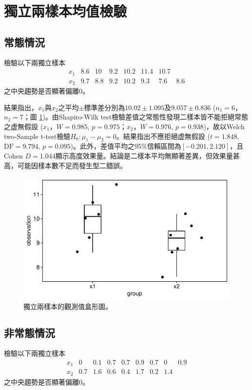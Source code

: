\documentclass[12pt]{article}
\begin{document}
\section{獨立兩樣本均值檢驗}
\subsection{常態情況}
檢驗以下兩獨立樣本
\[
\begin{matrix}
x_1 & 8.6 & 10 & 9.2 & 10.2 & 11.4 & 10.7 & \\
x_2 & 9.7 & 8.8 & 9.2 & 10.2 & 9.3 & 7.6 & 8.6
\end{matrix}
\]
之中央趨勢是否顯著偏離0。

結果指出，$x_1$與$x_2$之平均$\pm$標準差分別為$10.02 \pm 1.095$及$9.057 \pm 0.836$ ($n_1 = 6$，$n_2 = 7$；圖 \ref{fig:normal_independent_test})。由Shapiro-Wilk test檢驗差值之常態性發現二樣本皆不能拒絕常態之虚無假設 ($x_1$，$W = 0.985$, $p = 0.975$；$x_2$，$W = 0.976$, $p = 0.938$)，故以Welch two-Sample t-test檢驗$H_0: \mu_1 - \mu_2 = 0$。結果指出不應拒絕虚無假設 ($t = 1.848$, $\text{DF} = 9.794$, $p = 0.095$)。此外，差值平均之95\%信賴區間為$\left[-0.201, 2.120\right]$，且Cohen $D = 1.044$顯示高度效果量。結論是二樣本平均無顯著差異，但效果量甚高，可能因樣本數不足而發生型二錯誤。

\begin{figure}[htb!]
	\centering
	\includegraphics[]{normal_independent_test.pdf}
	\caption{獨立兩樣本的觀測值盒形圖。}
	\label{fig:normal_independent_test}
\end{figure}

\subsection{非常態情況}
檢驗以下兩獨立樣本
\[
\begin{matrix}
x_1 & 0 & 0.1 & 0.7 & 0.7 & 0.9 & 0.7 & 0 & 0.9 \\
x_2 & 0.7 & 1.6 & 0.6 & 0.4 & 1.7 & 0.2 & 1.4 & 
\end{matrix}
\]
之中央趨勢是否顯著偏離0。
\end{document}
